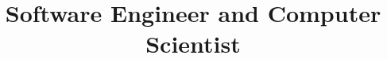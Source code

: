 \documentclass[11pt,a4paper,sans]{moderncv} %
\title{Software Engineer and  Computer Scientist}
\begin{document}

%
%
%
%
%
%
%
%
%
%
%
%
%
%
%


\makecvtitle %
\end{document}
